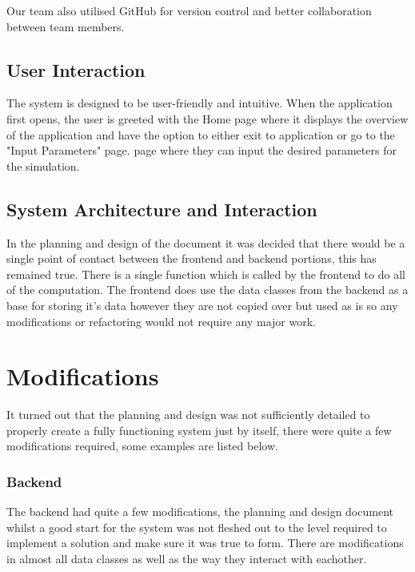 \documentclass{article}
\begin{document}
    Our team also utilised GitHub for version control and better collaboration between team members.

    \subsection{User Interaction}

    The system is designed to be user-friendly and intuitive. When the application first opens, the user is greeted with the Home page where it displays the overview of the application and have the option to either exit to application or go to the "Input Parameters" page.
    page where they can input the desired parameters for the simulation.

    \subsection{System Architecture and Interaction}

    In the planning and design of the document it was decided that there would be a single point of contact between
    the frontend and backend portions, this has remained true. There is a single function which is called by the
    frontend to do all of the computation. The frontend does use the data classes from the backend as a base for
    storing it's data however they are not copied over but used as is so any modifications or refactoring would not
    require any major work.


    \section{Modifications}

    It turned out that the planning and design was not sufficiently detailed to properly create a fully functioning
    system just by itself, there were quite a few modifications required, some examples are listed below.

    \subsubsection{Backend}

    The backend had quite a few modifications, the planning and design document whilst a good start for the system was
    not fleshed out to the level required to implement a solution and make sure it was true to form. There are modifications
    in almost all data classes as well as the way they interact with eachother.
\end{document}
